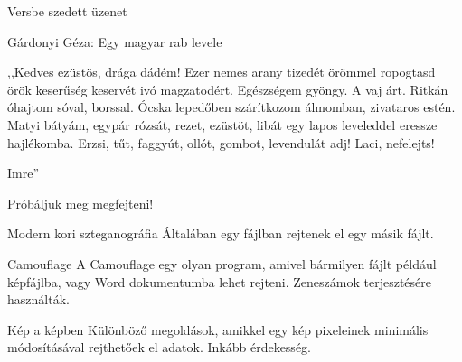 \documentclass[12 pt]{beamer}
\begin{document}

\begin{frame}{Versbe szedett üzenet}
  \begin{block}{Gárdonyi Géza: Egy magyar rab levele}

\centering
,,Kedves ezüstös, drága dádém!
Ezer nemes arany tizedét örömmel ropogtasd
örök keserűség keservét ivó magzatodért.
Egészségem gyöngy. A vaj árt. Ritkán óhajtom
sóval, borssal. Ócska lepedőben szárítkozom
álmomban, zivataros estén. Matyi
bátyám, egypár rózsát, rezet, ezüstöt, libát
egy lapos leveleddel eressze hajlékomba.
Erzsi, tűt, faggyút, ollót, gombot, levendulát adj!
Laci, nefelejts!

\qquad

\flushright Imre''
  \end{block}


Próbáljuk meg megfejteni!

\end{frame}


\begin{frame}{Modern kori szteganográfia}
  Általában egy fájlban rejtenek el egy másik fájlt.

  \begin{block}{Camouflage}
    A Camouflage egy olyan program, amivel bármilyen fájlt például képfájlba, vagy Word dokumentumba lehet rejteni. Zeneszámok terjesztésére használták.
  \end{block}

  \begin{block}{Kép a képben}
    Különböző megoldások, amikkel egy kép pixeleinek minimális módosításával rejthetőek el adatok. Inkább érdekesség.
  \end{block}

\end{frame}


\end{document}
